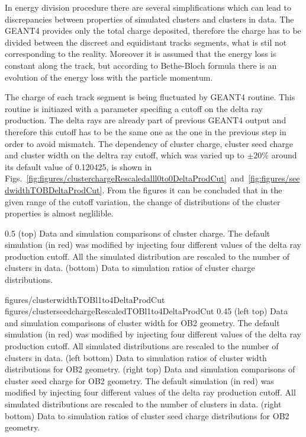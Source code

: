 In energy division procedure there are several simplifications which can lead to discrepancies between properties of simulated clusters and clusters in data. The GEANT4 provides only the total charge deposited, therefore the charge has to be divided between the discreet and equidistant tracks segments, what is stil not corresponding to the reality. Moreover it is assumed that the energy loss is constant along the track, but according to Bethe-Bloch formula there is an evolution of the energy loss with the particle momentum.

The charge of each track segment is being fluctuated by GEANT4 routine. This routine is initiazed with a parameter specifing a cutoff on the delta ray production. The delta rays are already part of previous GEANT4 output and therefore this cutoff has to be the same one as the one in the previous step in order to avoid mismatch. The dependency of cluster charge, cluster seed charge and cluster width on the deltra ray cutoff, which was varied up to $\pm 20\%$ around its default value of 0.120425, is shown in Figs.~\ref{fig:figures/clusterchargeRescaledalll0to0DeltaProdCut}~and~\ref{fig:figures/seedwidthTOBDeltaProdCut}. From the figures it can be concluded that in the given range of the cutoff variation, the change of distributions of the cluster properties is almost neglilible. 

                 {0.5}       %
                 { (top) Data and simulation comparisons of cluster charge. The default simulation (in red) was modified by injecting four different values of the delta ray production cutoff. All the simulated distribution are rescaled to the number of clusters in data. (bottom) Data to simulation ratios of cluster charge distributions. }

                 {figures/clusterwidthTOBl1to4DeltaProdCut}
                 {figures/clusterseedchargeRescaledTOBl1to4DeltaProdCut} %
                 {0.45}       %
                 {(left top) Data and simulation  comparisons of cluster width for OB2 geometry. The default simulation (in red) was modified by injecting four different values of the delta ray production cutoff. All simulated distributions are rescaled to the number of clusters in data. (left bottom) Data to simulation ratios of cluster width distributions for OB2 geometry. (right top) Data and simulation  comparisons of cluster seed charge for OB2 geometry. The default simulation (in red) was modified by injecting four different values of the delta ray production cutoff. All simulated distributions are rescaled to the number of clusters in data. (right bottom) Data to simulation ratios of cluster seed charge distributions for OB2 geometry. }


